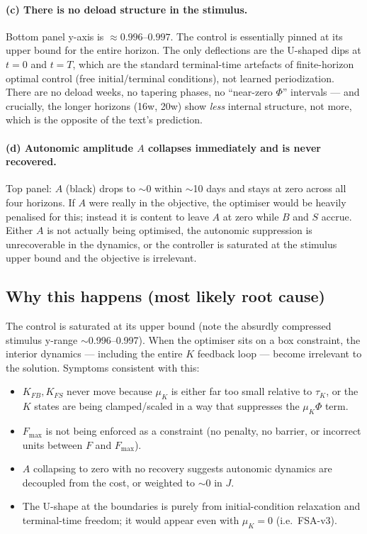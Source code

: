 \paragraph{(c) There is no deload structure in the stimulus.}
Bottom panel y-axis is $\approx 0.996$--$0.997$. The control is essentially pinned at its upper bound for the entire horizon. The only deflections are the U-shaped dips at $t=0$ and $t=T$, which are the standard terminal-time artefacts of finite-horizon optimal control (free initial/terminal conditions), not learned periodization. There are no deload weeks, no tapering phases, no ``near-zero $\Phi$'' intervals --- and crucially, the longer horizons (16w, 20w) show \emph{less} internal structure, not more, which is the opposite of the text's prediction.

\paragraph{(d) Autonomic amplitude $A$ collapses immediately and is never recovered.}
Top panel: $A$ (black) drops to $\sim 0$ within $\sim$10 days and stays at zero across all four horizons. If $A$ were really in the objective, the optimiser would be heavily penalised for this; instead it is content to leave $A$ at zero while $B$ and $S$ accrue. Either $A$ is not actually being optimised, the autonomic suppression is unrecoverable in the dynamics, or the controller is saturated at the stimulus upper bound and the objective is irrelevant.

\subsection{Why this happens (most likely root cause)}

The control is saturated at its upper bound (note the absurdly compressed stimulus y-range $\sim$0.996--0.997). When the optimiser sits on a box constraint, the interior dynamics --- including the entire $K$ feedback loop --- become irrelevant to the solution. Symptoms consistent with this:

\begin{itemize}
    \item $K_{FB}, K_{FS}$ never move because $\mu_K$ is either far too small relative to $\tau_K$, or the $K$ states are being clamped/scaled in a way that suppresses the $\mu_K \Phi$ term.
    \item $F_{\max}$ is not being enforced as a constraint (no penalty, no barrier, or incorrect units between $F$ and $F_{\max}$).
    \item $A$ collapsing to zero with no recovery suggests autonomic dynamics are decoupled from the cost, or weighted to $\sim 0$ in $J$.
    \item The U-shape at the boundaries is purely from initial-condition relaxation and terminal-time freedom; it would appear even with $\mu_K = 0$ (i.e.\ FSA-v3).
\end{itemize}

